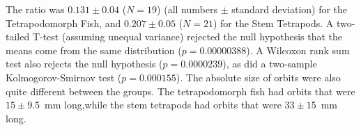 The ratio was $0.131 \pm 0.04$  ($N=19$) (all numbers $\pm$ standard deviation) for the Tetrapodomorph Fish, and $0.207 \pm  0.05$ ($N=21$) for the Stem Tetrapods. A two-tailed  T-test (assuming unequal variance) rejected the null hypothesis that the means come from the same distribution ($p = 0.00000388$). A Wilcoxon rank sum test also rejects the null hypothesis ($p = 0.0000239$), as did a two-sample Kolmogorov-Smirnov test ($p = 0.000155$).  The absolute size of orbits were also quite different between the groups. The tetrapodomorph fish had orbits that were $15 \pm 9.5$~mm long,while the stem tetrapods had orbits that were $33 \pm 15$~mm long.